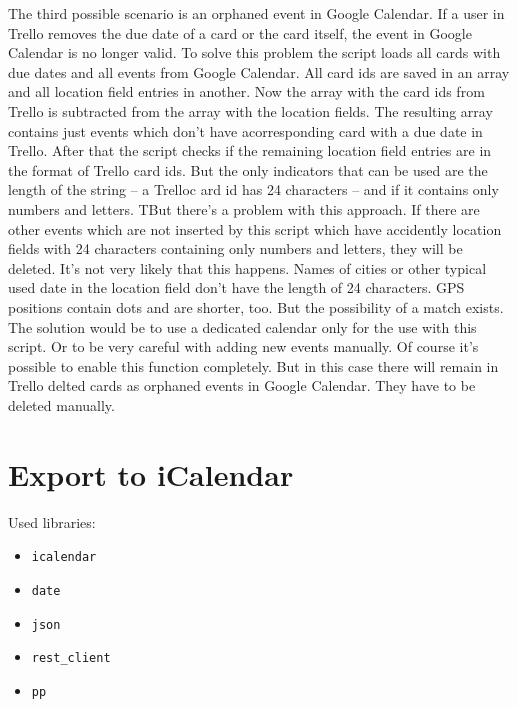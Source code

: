The third possible scenario is an orphaned event in Google Calendar. If a user in Trello removes the due date of a card or the card itself, the event in Google Calendar is no longer valid. To solve this problem the script loads all cards with due dates and all events from Google Calendar. All card ids are saved in an array and all location field entries in another. Now the array with the card ids from Trello is subtracted from the array with the location fields. The resulting array contains just events which don't have acorresponding card with a due date in Trello. After that the script checks if the remaining location field entries are in the format of Trello card ids. But the only indicators that can be used are the length of the string – a Trelloc ard id has 24 characters – and if it contains only numbers and letters. TBut there's a problem with this approach. If there are other events which are not inserted by this script which have accidently location fields with 24 characters containing only numbers and letters, they will be deleted. It's not very likely that this happens. Names of cities or other typical used date in the location field don't have the length of 24 characters. GPS positions contain dots and are shorter, too. But the possibility of a match exists. The solution would be to use a dedicated calendar only for the use with this script. Or to be very careful with adding new events manually. Of course it's possible to enable this function completely. But in this case there will remain in Trello delted cards as orphaned events in Google Calendar. They have to be deleted manually.

\section{Export to iCalendar}

Used libraries:
\begin{itemize}
	\item \texttt{icalendar}
	\item \texttt{date}
	\item \texttt{json}
	\item \texttt{rest\_client}
	\item \texttt{pp}
\end{itemize}

